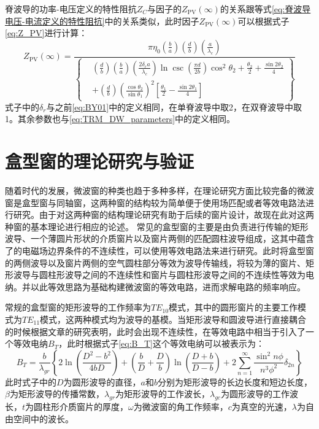 \documentclass[master]{thesis-uestc}
\begin{document}
脊波导的功率-电压定义的特性阻抗\(Z_C\)与因子的\(Z_{\mathrm{PV}}(\infty)\)的关系跟等式\ref{eq:脊波导电压-电流定义的特性阻抗}中的关系类似，此时因子\(Z_{\mathrm{PV}}(\infty)\)可以根据式子\ref{eq:Z_PV}进行计算：
\begin{equation}\label{eq:Z_PV}
    Z_{\mathrm{PV}}(\infty) = \frac{\pi \eta_0 \left( \frac{b}{a} \right) \left( \frac{d}{b} \right) \left( \frac{a}{\lambda_c} \right)}{
        \left\{ 
            \begin{aligned}
                & \left( \frac{d}{b} \right) \left( \frac{b}{a} \right) \left( \frac{2 \delta_r a}{\lambda_c} \right) \ln \csc \left( \frac{\pi d}{2b} \right) \cos^2 \theta_2 + \frac{\theta_2}{2} + \frac{\sin 2\theta_2}{4} \\
                & + \left( \frac{d}{b} \right) \left( \frac{\cos \theta_2}{\sin \theta_1} \right)^2 \left[ \frac{\theta_1}{2} - \frac{\sin 2\theta_1}{4} \right]
            \end{aligned}
        \right\}
    }
\end{equation}
式子中的$\delta_{r}$与之前\ref{eq:BY01}中的定义相同，在单脊波导中取2，在双脊波导中取1。其余参数也与\ref{eq:TRM_DW_parameters}中的定义相同。

\section{盒型窗的理论研究与验证}\label{sec:PillBoxTheory}
随着时代的发展，微波窗的种类也趋于多种多样，在理论研究方面比较完备的微波窗是盒型窗与同轴窗，这两种窗的结构较为简单便于使用场匹配或者等效电路法进行研究。由于对这两种窗的结构理论研究有助于后续的窗片设计，故现在此对这两种窗的基本理论进行相应的论述。
常见的盒型窗的主要是由负责进行传输的矩形波导、一个薄圆片形状的介质窗片以及窗片两侧的匹配圆柱波导组成，这其中蕴含了的电磁场边界条件的不连续性，可以使用等效电路法来进行研究。此时将盒型窗的两侧波导以及窗片两侧的空气圆柱部分等效为波导传输线，将较为薄的窗片、矩形波导与圆柱形波导之间的不连续性和窗片与圆柱形波导之间的不连续性等效为电纳。并以此等效思路为基础构建微波窗的等效电路，进而求解电路的频率响应。

常规的盒型窗的矩形波导的工作频率为$TE_{10}$模式，其中的圆形窗片的主要工作模式为$TE_{11}$模式，这两种模式均为波导的基模。当矩形波导和圆波导进行直接耦合的时候根据文章的研究表明，此时会出现不连续性，在等效电路中相当于引入了一个等效电纳$B_{T}$，此时根据式子\ref{eq:B_T}这个等效电纳可以被表示为：
\begin{equation}\label{eq:B_T}
    B_{T}=\frac{b}{\lambda_{g r}}\left\{2 \ln \left(\frac{D^{2}-b^{2}}{4 b D}\right)+\left(\frac{b}{D}+\frac{D}{b}\right) \ln \left(\frac{D+b}{D-b}\right)+2 \sum_{n=1}^{\infty} \frac{\sin ^{2} n \phi}{n^{3} \phi^{2}} \delta_{2 n}\right\}
\end{equation}
此时式子中的$D$为圆形波导的直径，$a$和$b$分别为矩形波导的长边长度和短边长度，$\beta$为矩形波导的传播常数，$\lambda_{g r}$为矩形波导的工作波长，$\lambda_{g c}$为圆形波导的工作波长，$t$为圆柱形介质窗片的厚度，$\omega$为微波窗的角工作频率，$c$为真空的光速，$\lambda$为自由空间中的波长。
\end{document}
